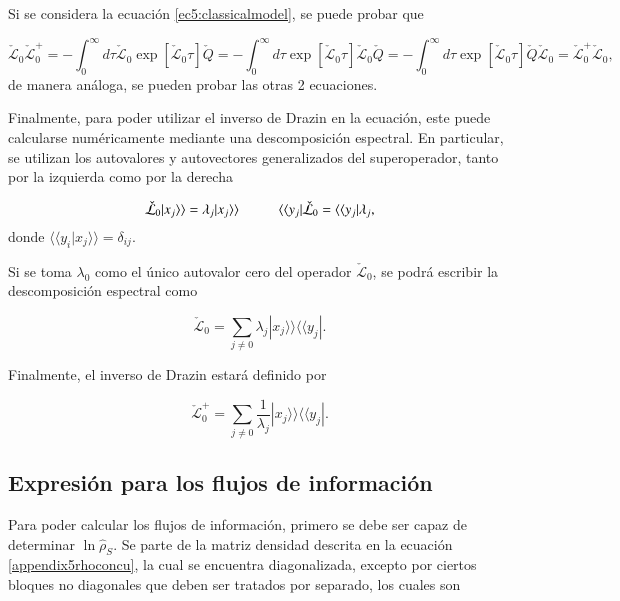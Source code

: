 \begin{appendixs}
Si se considera la ecuación \ref{ec5:classicalmodel}, se puede probar que 

\begin{equation*}
    \check{\mathcal{L}}_{0}\check{\mathcal{L}}_{0}^{+} = - \int_{0}^{\infty}d\tau \check{\mathcal{L}}_{0}\exp[ \check{\mathcal{L}}_{0}\tau] \check{Q}= - \int_{0}^{\infty}d\tau \exp[ \check{\mathcal{L}}_{0}\tau]\check{\mathcal{L}}_{0} \check{Q} = - \int_{0}^{\infty}d\tau \exp[ \check{\mathcal{L}}_{0}\tau] \check{Q} \check{\mathcal{L}}_{0} = \check{\mathcal{L}}_{0}^{+}\check{\mathcal{L}}_{0},
\end{equation*}
de manera análoga, se pueden probar las otras 2 ecuaciones.

Finalmente, para poder utilizar el inverso de Drazin en la ecuación, este puede calcularse numéricamente mediante una descomposición espectral. En particular, se utilizan los autovalores y autovectores generalizados del superoperador, tanto por la izquierda como por la derecha

\begin{equation*}
    \check{\mathcal{L}}_{0}|x_{j}\rangle \rangle = \lambda_{j} |x_{j}\rangle \rangle \hspace{10mm}  \langle \langle y_{j}|\check{\mathcal{L}}_{0} = \langle \langle y_{j}|\lambda_{j},
\end{equation*}
donde $\langle \langle y_{i}|x_{j}\rangle \rangle = \delta_{ij}$. 

Si se toma $\lambda_{0}$ como el único autovalor cero del operador $\check{\mathcal{L}}_{0}$, se podrá escribir la descomposición espectral como

\begin{equation*}
    \check{\mathcal{L}}_{0} = \sum_{j\neq 0}\lambda_{j}|x_{j}\rangle \rangle \langle \langle y_{j}|.
\end{equation*}

Finalmente, el inverso de Drazin estará definido por 

\begin{equation*}
    \check{\mathcal{L}}^{+}_{0} = \sum_{j\neq 0}\frac{1}{\lambda_{j}}|x_{j}\rangle \rangle \langle \langle y_{j}|.
\end{equation*}

\label{appendix5drazin}

\subsection{Expresión para los flujos de información}
Para poder calcular los flujos de información, primero se debe ser capaz de determinar $\ln \hat{\rho}_{S}$. Se parte de la matriz densidad descrita en la ecuación \ref{appendix5rhoconcu}, la cual se encuentra diagonalizada, excepto por ciertos bloques no diagonales que deben ser tratados por separado, los cuales son 


\end{appendixs}
